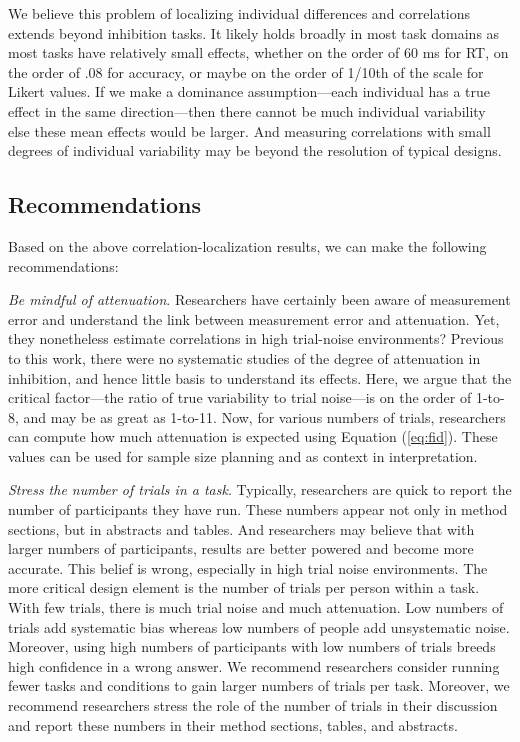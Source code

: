 \documentclass[
  ,man]{apa6}
\begin{document}
We believe this problem of localizing individual differences and correlations extends beyond inhibition tasks. It likely holds broadly in most task domains as most tasks have relatively small effects, whether on the order of 60 ms for RT, on the order of .08 for accuracy, or maybe on the order of 1/10th of the scale for Likert values. If we make a dominance assumption---each individual has a true effect in the same direction---then there cannot be much individual variability else these mean effects would be larger. And measuring correlations with small degrees of individual variability may be beyond the resolution of typical designs.

\hypertarget{recommendations}{%
\subsection{Recommendations}\label{recommendations}}

Based on the above correlation-localization results, we can make the following recommendations:

\emph{Be mindful of attenuation}. Researchers have certainly been aware of measurement error and understand the link between measurement error and attenuation. Yet, they nonetheless estimate correlations in high trial-noise environments? Previous to this work, there were no systematic studies of the degree of attenuation in inhibition, and hence little basis to understand its effects. Here, we argue that the critical factor---the ratio of true variability to trial noise---is on the order of 1-to-8, and may be as great as 1-to-11. Now, for various numbers of trials, researchers can compute how much attenuation is expected using Equation (\ref{eq:fid}). These values can be used for sample size planning and as context in interpretation.

\emph{Stress the number of trials in a task}. Typically, researchers are quick to report the number of participants they have run. These numbers appear not only in method sections, but in abstracts and tables. And researchers may believe that with larger numbers of participants, results are better powered and become more accurate. This belief is wrong, especially in high trial noise environments. The more critical design element is the number of trials per person within a task. With few trials, there is much trial noise and much attenuation. Low numbers of trials add systematic bias whereas low numbers of people add unsystematic noise. Moreover, using high numbers of participants with low numbers of trials breeds high confidence in a wrong answer. We recommend researchers consider running fewer tasks and conditions to gain larger numbers of trials per task. Moreover, we recommend researchers stress the role of the number of trials in their discussion and report these numbers in their method sections, tables, and abstracts.
\end{document}
